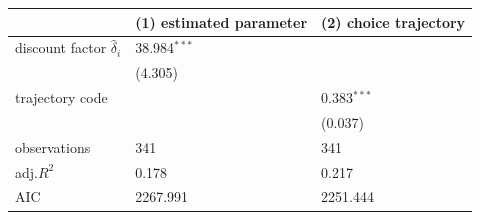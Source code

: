 \begin{tabular}{lll}
\hline
 & (1) estimated parameter & (2) choice trajectory \\
\hline
discount factor $\hat{\delta}_i$ & 38.984$^{***}$ &  \\
 & (4.305) &  \\
trajectory code &  & 0.383$^{***}$ \\
 &  & (0.037) \\
observations & 341 & 341 \\
adj.$R^2$ & 0.178 & 0.217 \\
AIC & 2267.991 & 2251.444 \\
\hline
\end{tabular}
